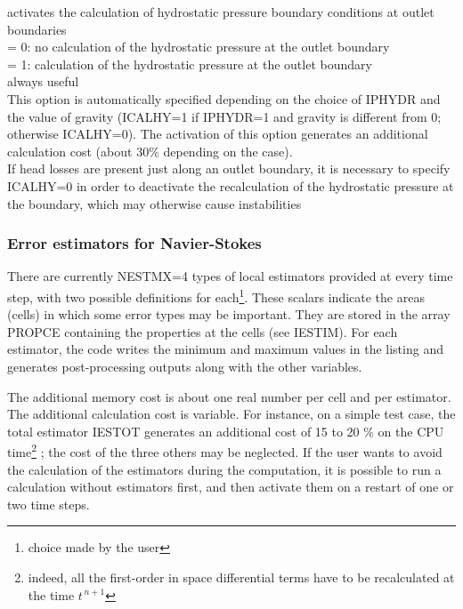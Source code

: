{activates the calculation of hydrostatic pressure boundary conditions at outlet
boundaries\\
\hspace*{1.3cm}= 0: no calculation of the hydrostatic pressure at the outlet boundary\\
\hspace*{1.3cm}= 1: calculation of the hydrostatic pressure at the outlet boundary\\
always useful\\
This option is automatically specified depending on the
choice of IPHYDR and the value of gravity
(ICALHY=1 if IPHYDR=1 and gravity is different from 0; otherwise
ICALHY=0). The activation of this option generates an additional
calculation cost (about 30\% depending on the case).\\
If head losses are present just along an outlet boundary, it is necessary to
specify ICALHY=0 in order to deactivate the recalculation of the hydrostatic
pressure at the boundary, which may otherwise cause instabilities}



\subsubsection{Error estimators for Navier-Stokes}

There are currently NESTMX=4 types of local estimators
provided at every time step, with two possible definitions for
each\footnote{choice made by the user}. These scalars indicate the areas
(cells) in which some error types may be important. They are
stored in the array PROPCE containing the properties at the cells (see
IESTIM). For each estimator, the code writes the minimum and
maximum values in the listing and generates post-processing outputs along with
the other variables.

The additional memory cost is about one real number per cell and per
estimator. The additional calculation cost is variable. For instance, on a 
simple test case, the total estimator IESTOT generates an additional cost 
of 15 to 20 $\%$ on the CPU time\footnote{indeed, all the first-order in
space differential terms have to be recalculated at the time $t^{\,n+1}$} ;
the cost of the three others may be neglected. If the user wants to
avoid the calculation of the estimators during the computation, it is
possible to run a calculation without estimators first, and then activate them on
a restart of one or two time steps.

